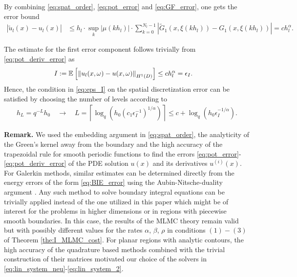 By combining \eqref{eq:spat_order}, \eqref{eq:pot_error} and \eqref{eq:GF_error}, one gets the error bound
\begin{align*}
| \tilde{u}_l(x) - u_l(x) |
&\leq h_l \cdot \sup_{k} |\mu(kh_l)| \cdot \sum_{k=0}^{N_l-1} \left| \tilde{G}_1(x,\xi(kh_l)) - G_1(x,\xi(kh_l)) \right|
= c h_l^{\alpha}.
\end{align*}

The estimate for the first error component follows trivially from \eqref{eq:pot_deriv_error} as
\begin{align}\label{eq:H_s_pot_err}
I &:= \mathbb{E}_{{}} \left[ {\left\|  u_l(x,\omega) - u(x,\omega) \right\|_{H^1(D)}} \right]
\leq c h_l^{\alpha} = \epsilon_I.
\end{align}
Hence, the condition in \eqref{eq:eps_I} on the spatial discretization error can be satisfied by choosing the number of levels according to
\begin{align*}%
	h_L = q^{-L} h_0
	\quad
	\to
	\quad
	L = \left\lceil \log_q \left( h_0 (c_1 \epsilon_I^{-1})^{1/\alpha} \right) \right\rceil
	\leq c + \log_q \left( h_0 \epsilon_I^{-1/\alpha} \right).
\end{align*}	


\textbf{Remark.} 
We used the embedding argument in \eqref{eq:spat_order}, the analyticity of the Green's kernel away from the boundary and the high accuracy of the trapezoidal rule for smooth periodic functions to find the errors \eqref{eq:pot_error}-\eqref{eq:pot_deriv_error} of the PDE solution $u(x)$ and its derivatives $u^{(i)}(x)$.
For Galerkin methods, similar estimates can be determined directly from the energy errors of the form \eqref{eq:BIE_error} using the Aubin-Nitsche-duality argument \cite{sauter2010boundary,steinbach2007numerical}.
Any such method to solve boundary integral equations can be trivially applied instead of the one utilized in this paper which might be of interest for the problems in higher dimensions or in regions with piecewise smooth boundaries.
In this case, the results of the MLMC theory remain valid but with possibly different values for the rates $\alpha$, $\beta$, $\rho$ in conditions $(1)-(3)$ of Theorem \ref{the:I_MLMC_cost}. %
For planar regions with analytic contours, the high accuracy of the quadrature based methods combined with the trivial construction of their matrices motivated our choice of the solvers in \eqref{eq:lin_system_neu}-\eqref{eq:lin_system_2}.



